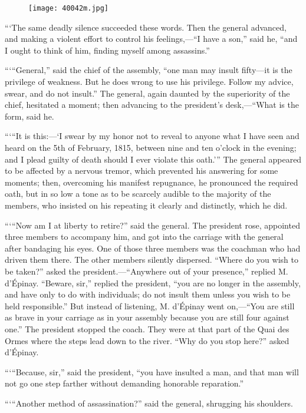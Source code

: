 \begin{figure}[ht]
\texttt{[image: 40042m.jpg]}
\end{figure}

“‘The same deadly silence succeeded these words. Then the general
advanced, and making a violent effort to control his feelings,—“I have
a son,” said he, “and I ought to think of him, finding myself among
assassins.”

“‘“General,” said the chief of the assembly, “one man may insult
fifty—it is the privilege of weakness. But he does wrong to use his
privilege. Follow my advice, swear, and do not insult.” The general,
again daunted by the superiority of the chief, hesitated a moment; then
advancing to the president’s desk,—“What is the form, said he.

“‘“It is this:—‘I swear by my honor not to reveal to anyone what I have
seen and heard on the 5th of February, 1815, between nine and ten
o’clock in the evening; and I plead guilty of death should I ever
violate this oath.’” The general appeared to be affected by a nervous
tremor, which prevented his answering for some moments; then,
overcoming his manifest repugnance, he pronounced the required oath,
but in so low a tone as to be scarcely audible to the majority of the
members, who insisted on his repeating it clearly and distinctly, which
he did.

“‘“Now am I at liberty to retire?” said the general. The president
rose, appointed three members to accompany him, and got into the
carriage with the general after bandaging his eyes. One of those three
members was the coachman who had driven them there. The other members
silently dispersed. “Where do you wish to be taken?” asked the
president.—“Anywhere out of your presence,” replied M. d’Épinay.
“Beware, sir,” replied the president, “you are no longer in the
assembly, and have only to do with individuals; do not insult them
unless you wish to be held responsible.” But instead of listening, M.
d’Épinay went on,—“You are still as brave in your carriage as in your
assembly because you are still four against one.” The president stopped
the coach. They were at that part of the Quai des Ormes where the steps
lead down to the river. “Why do you stop here?” asked d’Épinay.

“‘“Because, sir,” said the president, “you have insulted a man, and
that man will not go one step farther without demanding honorable
reparation.”

“‘“Another method of assassination?” said the general, shrugging his
shoulders.

